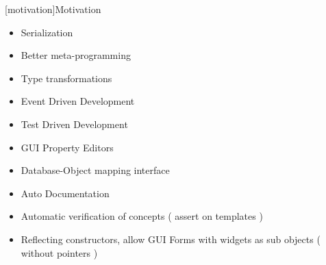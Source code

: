 [motivation]{Motivation}
\begin{itemize}
\item Serialization
\item Better meta-programming 
\item Type transformations
\item Event Driven Development
\item Test Driven Development
\item GUI Property Editors
\item Database-Object mapping interface
\item Auto Documentation
\item Automatic verification of concepts ( assert on templates )
\item Reflecting constructors, allow GUI Forms with widgets as sub objects ( without pointers ) 
\end{itemize}






